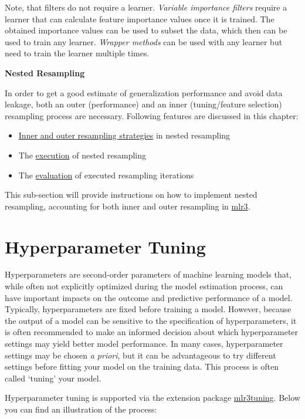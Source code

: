 \documentclass[]{scrbook}
\providecommand{\tightlist}{%
  \setlength{\itemsep}{0pt}\setlength{\parskip}{0pt}}
\begin{document}
Note, that filters do not require a learner.
\emph{Variable importance filters} require a learner that can calculate feature importance values once it is trained.
The obtained importance values can be used to subset the data, which then can be used to train any learner.
\emph{Wrapper methods} can be used with any learner but need to train the learner multiple times.

\textbf{Nested Resampling}

In order to get a good estimate of generalization performance and avoid data leakage, both an outer (performance) and an inner (tuning/feature selection) resampling process are necessary.
Following features are discussed in this chapter:

\begin{itemize}
\tightlist
\item
  \protect\hyperlink{nested-resampling}{Inner and outer resampling strategies} in nested resampling
\item
  The \protect\hyperlink{nested-resamp-exec}{execution} of nested resampling
\item
  The \protect\hyperlink{nested-resamp-eval}{evaluation} of executed resampling iterations
\end{itemize}

This sub-section will provide instructions on how to implement nested resampling, accounting for both inner and outer resampling in \href{https://mlr3.mlr-org.com}{mlr3}.

\hypertarget{tuning}{%
\section{Hyperparameter Tuning}\label{tuning}}

Hyperparameters are second-order parameters of machine learning models that, while often not explicitly optimized during the model estimation process, can have important impacts on the outcome and predictive performance of a model.
Typically, hyperparameters are fixed before training a model.
However, because the output of a model can be sensitive to the specification of hyperparameters, it is often recommended to make an informed decision about which hyperparameter settings may yield better model performance.
In many cases, hyperparameter settings may be chosen \emph{a priori}, but it can be advantageous to try different settings before fitting your model on the training data.
This process is often called `tuning' your model.

Hyperparameter tuning is supported via the extension package \href{https://mlr3tuning.mlr-org.com}{mlr3tuning}.
Below you can find an illustration of the process:
\end{document}
